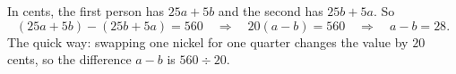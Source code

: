 In cents, the first person has $25a+5b$ and the second has $25b+5a$. So
\[
(25a+5b)-(25b+5a)=560\quad\Longrightarrow\quad 20(a-b)=560\quad\Longrightarrow\quad a-b=\boxed{28}.
\]
The quick way: swapping one nickel for one quarter changes the value by $20$ cents, so the difference $a-b$ is $560\div20$.
